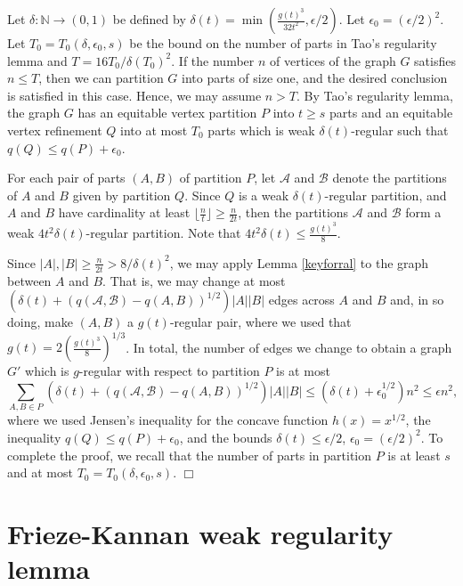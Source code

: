 \documentclass[11pt]{article}
\newenvironment{proof}
      {\medskip\noindent{\bf Proof:}\hspace{1mm}}
      {\hfill$\Box$\medskip}
\begin{document}
\begin{proof}
Let $\delta:\mathbb{N} \rightarrow (0,1)$ be defined by
$\delta(t)=\min\left(\frac{g(t)^{3}}{32t^2},\epsilon/2\right)$. Let
$\epsilon_0=(\epsilon/2)^2$. Let $T_0=T_0(\delta,\epsilon_0,s)$ be the bound on
the number of parts in Tao's regularity lemma and $T=16T_0/\delta(T_0)^2$. If
the number $n$ of vertices of the graph $G$ satisfies $n \leq T$, then we can
partition $G$ into parts of size one, and the desired conclusion is satisfied
in this case. Hence, we may assume $n > T$. By Tao's regularity lemma, the
graph $G$ has an equitable vertex partition $P$ into $t \geq s$ parts and an equitable
vertex refinement $Q$ into at most $T_0$ parts which is weak
$\delta(t)$-regular such that $q(Q) \leq q(P)+\epsilon_0$.

For each pair of parts $(A,B)$ of partition $P$, let $\mathcal{A}$ and
$\mathcal{B}$ denote the partitions of $A$ and $B$ given by partition $Q$.
Since $Q$ is a weak $\delta(t)$-regular partition, and $A$ and $B$ have
cardinality at least $\lfloor \frac{n}{t} \rfloor \geq \frac{n}{2t}$, then the
partitions $\mathcal{A}$ and $\mathcal{B}$ form a weak $4t^2\delta(t)$-regular
partition. Note that $4t^2\delta(t) \leq \frac{g(t)^3}{8}$.

Since $|A|, |B| \geq \frac{n}{2t} > 8/\delta(t)^2$, we may apply Lemma
\ref{keyforral} to the graph between $A$ and $B$. That is, we may change at most
$\left(\delta(t)+\left(q(\mathcal{A},\mathcal{B})-q(A,B)
\right)^{1/2}\right)|A||B|$ edges across $A$ and $B$ and, in so doing, make
$(A,B)$ a $g(t)$-regular pair, where we used
that $g(t)=2\left(\frac{g(t)^3}{8}\right)^{1/3}$. In total, the number of edges
we change to obtain a graph $G'$ which is $g$-regular with respect to partition
$P$ is at most $$\sum_{A,B \in P}
\left(\delta(t)+\left(q(\mathcal{A},\mathcal{B})-q(A,B) \right)^{1/2}\right)|A||B|
\leq (\delta(t)+\epsilon_0^{1/2})n^2 \leq \epsilon n^2,$$
where we used Jensen's inequality for the concave function $h(x)=x^{1/2}$, the
inequality $q(Q) \leq q(P)+\epsilon_0$, and the bounds $\delta(t) \leq
\epsilon/2$, $\epsilon_0=(\epsilon/2)^2$.
To complete the proof, we recall that the number of parts in partition $P$ is at least $s$ and at most $T_0=T_0(\delta,\epsilon_0,s)$.
\end{proof}

\section{Frieze-Kannan weak regularity lemma}\label{weakregsection}
\end{document}
